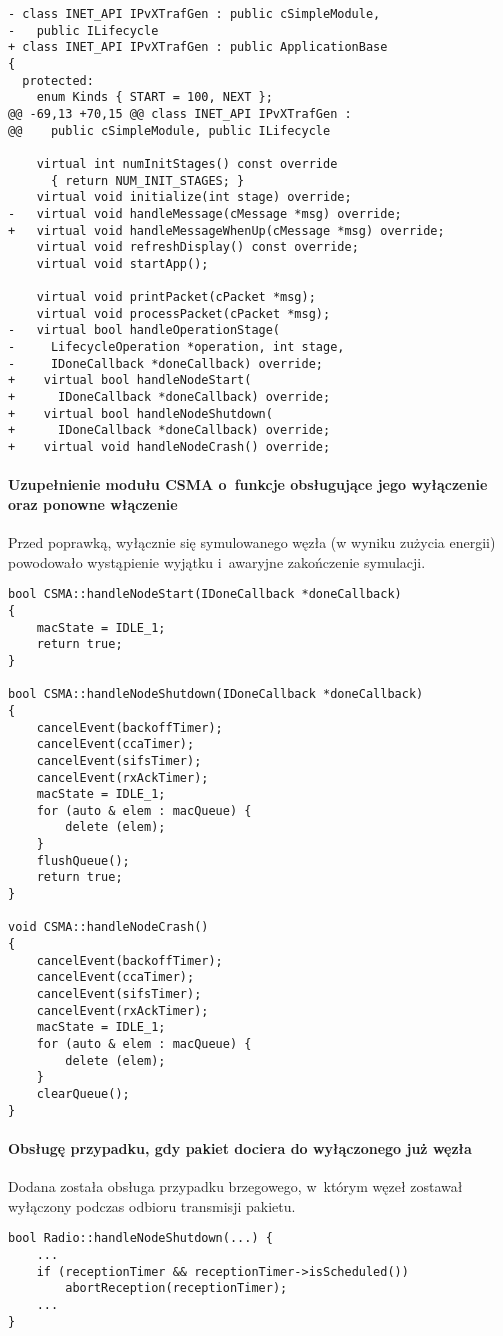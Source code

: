 \begin{verbatim}
- class INET_API IPvXTrafGen : public cSimpleModule,
-   public ILifecycle
+ class INET_API IPvXTrafGen : public ApplicationBase
{
  protected:
    enum Kinds { START = 100, NEXT };
@@ -69,13 +70,15 @@ class INET_API IPvXTrafGen :
@@    public cSimpleModule, public ILifecycle

    virtual int numInitStages() const override
      { return NUM_INIT_STAGES; }
    virtual void initialize(int stage) override;
-   virtual void handleMessage(cMessage *msg) override;
+   virtual void handleMessageWhenUp(cMessage *msg) override;
    virtual void refreshDisplay() const override;
    virtual void startApp();

    virtual void printPacket(cPacket *msg);
    virtual void processPacket(cPacket *msg);
-   virtual bool handleOperationStage(
-     LifecycleOperation *operation, int stage,
-     IDoneCallback *doneCallback) override;
+    virtual bool handleNodeStart(
+      IDoneCallback *doneCallback) override;
+    virtual bool handleNodeShutdown(
+      IDoneCallback *doneCallback) override;
+    virtual void handleNodeCrash() override;
\end{verbatim}

\paragraph{Uzupełnienie modułu CSMA o~funkcje obsługujące jego wyłączenie oraz ponowne włączenie} Przed poprawką, wyłącznie się symulowanego węzła (w wyniku zużycia energii) powodowało wystąpienie wyjątku i~awaryjne zakończenie symulacji.

\begin{verbatim}
bool CSMA::handleNodeStart(IDoneCallback *doneCallback)
{
    macState = IDLE_1;
    return true;
}

bool CSMA::handleNodeShutdown(IDoneCallback *doneCallback)
{
    cancelEvent(backoffTimer);
    cancelEvent(ccaTimer);
    cancelEvent(sifsTimer);
    cancelEvent(rxAckTimer);
    macState = IDLE_1;
    for (auto & elem : macQueue) {
        delete (elem);
    }
    flushQueue();
    return true;
}

void CSMA::handleNodeCrash()
{
    cancelEvent(backoffTimer);
    cancelEvent(ccaTimer);
    cancelEvent(sifsTimer);
    cancelEvent(rxAckTimer);
    macState = IDLE_1;
    for (auto & elem : macQueue) {
        delete (elem);
    }
    clearQueue();
}
\end{verbatim}

\paragraph{Obsługę przypadku, gdy pakiet dociera do wyłączonego już węzła} Dodana została obsługa przypadku brzegowego, w~którym węzeł zostawał wyłączony podczas odbioru transmisji pakietu.
\begin{verbatim}
bool Radio::handleNodeShutdown(...) {
    ...
    if (receptionTimer && receptionTimer->isScheduled())
        abortReception(receptionTimer);
    ...
}
\end{verbatim}